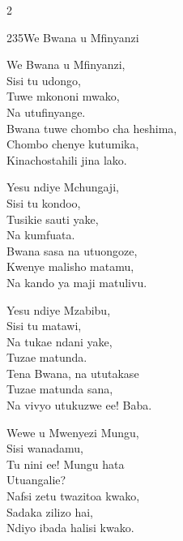 \documentclass{article}
\begin{document}
\begin{multicols}{2}
\begin{hymn}{235}{We Bwana u Mfinyanzi}{}
\begin{stanza}
We Bwana u Mfinyanzi,\\
Sisi tu udongo,\\
Tuwe mkononi mwako,\\
Na utufinyange.\\
Bwana tuwe chombo cha heshima,\\
Chombo chenye kutumika,\\
Kinachostahili jina lako.
\end{stanza}
\begin{stanza}
Yesu ndiye Mchungaji,\\
Sisi tu kondoo,\\
Tusikie sauti yake,\\
Na kumfuata.\\
Bwana sasa na utuongoze,\\
Kwenye malisho matamu,\\
Na kando ya maji matulivu.
\end{stanza}
\begin{stanza}
Yesu ndiye Mzabibu,\\
Sisi tu matawi,\\
Na tukae ndani yake,\\
Tuzae matunda.\\
Tena Bwana, na ututakase\\
Tuzae matunda sana,\\
Na vivyo utukuzwe ee! Baba.
\end{stanza}
\begin{stanza}
Wewe u Mwenyezi Mungu,\\
Sisi wanadamu,\\
Tu nini ee! Mungu hata\\
Utuangalie?\\
Nafsi zetu twazitoa kwako,\\
Sadaka zilizo hai,\\
Ndiyo ibada halisi kwako.
\end{stanza}
\end{hymn}


\end{multicols}
\end{document}
